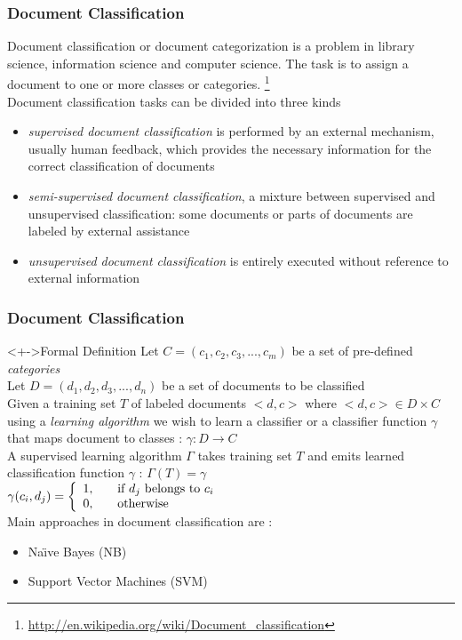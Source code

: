 \documentclass[serif,11pt,aspectratio=1610,table]{beamer}
\begin{document}
\begin{frame}[fragile]
 \frametitle{Document Classification}
Document classification or document categorization is a problem in library science, information science and computer science. The task is to assign a document to one or more classes or categories. \footnote{\url{http://en.wikipedia.org/wiki/Document_classification}} \\
Document classification tasks can be divided into three kinds
\begin{itemize}
 \item \emph{supervised document classification} is performed by an external mechanism, usually human feedback, which provides the necessary information for the correct classification of documents
 \item \emph{semi-supervised document classification}, a mixture between supervised and unsupervised classification: some documents or parts of documents are labeled by external assistance
 \item \emph{unsupervised document classification} is entirely executed without reference to external information
\end{itemize}

\end{frame}


\begin{frame}[fragile]
 \frametitle{Document Classification}
\begin{block}<+->{Formal Definition}
 Let $C = (c_{1},c_{2},c_{3},...,c_{m})$ be a set of pre-defined \emph{categories} \\
 Let $D = (d_{1},d_{2},d_{3},...,d_{n})$ be a set of documents to be classified \\
 Given a training set $T$ of labeled documents $\big < d,c \big > $ where $\big < d,c \big > \in D \times C $ using a \emph{learning algorithm} we wish to learn a classifier or a classifier function $ \gamma $ that maps document to classes : $\gamma : D \to C$ \\
 A supervised learning algorithm $\Gamma$ takes training set $T$ and emits learned classification function $\gamma$  : $\Gamma(T) = \gamma$\\

 $\gamma(c_{i},d_{j}) = \left\{
  \begin{array}{l l} 
   1, & \quad \text{if $d_{j}$ belongs to $c_{i}$} \\
   0, & \quad \text{otherwise} \\
  \end{array} \right. $ \\
Main approaches in document classification are :
\begin{itemize}
 \item Na\"{\i}ve Bayes (NB)
 \item Support Vector Machines (SVM)
\end{itemize}

\end{block}

\end{frame}
\end{document}
